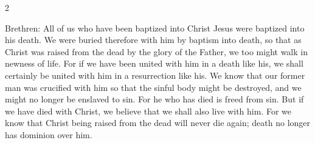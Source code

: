 \begin{multicols}{2}






  Brethren: All of us who have been baptized into Christ Jesus were baptized
  into his death. We were buried therefore with him by baptism into death, so
  that as Christ was raised from the dead by the glory of the Father, we too
  might walk in newness of life. For if we have been united with him in a death
  like his, we shall certainly be united with him in a resurrection like his.
  We know that our former man was crucified with him so that the sinful body
  might be destroyed, and we might no longer be enslaved to sin. For he who has
  died is freed from sin. But if we have died with Christ, we believe that we
  shall also live with him. For we know that Christ being raised from the dead
  will never die again; death no longer has dominion over him.

  \vspace{2mm}




\end{multicols}
